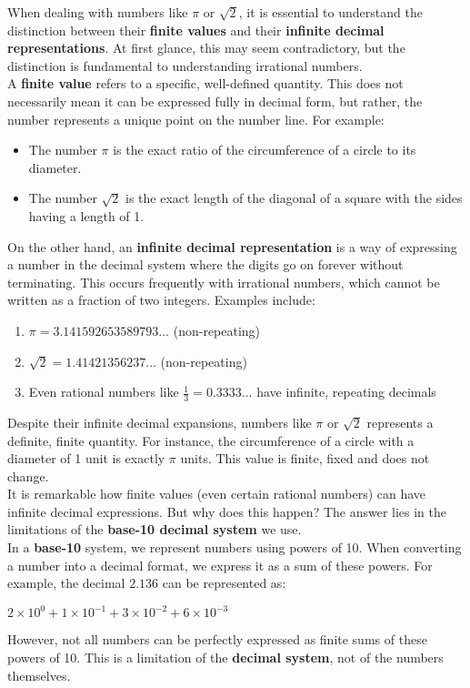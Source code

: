 \documentclass[12pt]{article}
\begin{document}
\noindent When dealing with numbers like $\pi$ or $\sqrt{2}$, it is essential to understand the distinction between their \textbf{finite values} and their \textbf{infinite decimal representations}. At first glance, this may seem contradictory, but the distinction is fundamental to understanding irrational numbers.\\

\noindent A \textbf{finite value} refers to a specific, well-defined quantity. This does not necessarily mean it can be expressed fully in decimal form, but rather, the number represents a unique point on the number line. For example:
\begin{itemize}
    \item The number $\pi$ is the exact ratio of the circumference of a circle to its diameter.
    \item The number $\sqrt{2}$ is the exact length of the diagonal of a square with the sides having a length of 1.
\end{itemize}

\noindent On the other hand, an \textbf{infinite decimal representation} is a way of expressing a number in the decimal system where the digits go on forever without terminating. This occurs frequently with irrational numbers, which cannot be written as a fraction of two integers. Examples include:

\begin{enumerate}
    \item $\pi = 3.141592653589793\ldots$ (non-repeating)
    \item $\sqrt{2} = 1.41421356237\ldots$ (non-repeating)
    \item Even rational numbers like $\frac{1}{3} = 0.3333\ldots$ have infinite, repeating decimals
\end{enumerate}

\noindent Despite their infinite decimal expansions, numbers like $\pi$ or $\sqrt{2}$ represents a definite, finite quantity. For instance, the circumference of a circle with a diameter of 1 unit is exactly $\pi$ units. This value is finite, fixed and does not change.\\

\noindent It is remarkable how finite values (even certain rational numbers) can have infinite decimal expressions. But why does this happen? The answer lies in the limitations of the \textbf{base-10 decimal system} we use. \\

\noindent In a \textbf{base-10} system, we represent numbers using powers of 10. When converting a number into a decimal format, we express it as a sum of these powers. For example, the decimal $2.136$ can be represented as:
\begin{center}
    $2 \times 10^0 + 1 \times 10^{-1} + 3 \times 10^{-2} + 6 \times 10^{-3}$
\end{center}
However, not all numbers can be perfectly expressed as finite sums of these powers of 10. This is a limitation of the \textbf{decimal system}, not of the numbers themselves.\\
\end{document}
